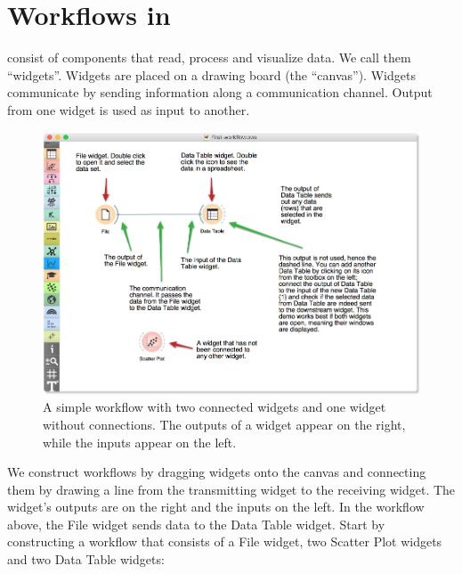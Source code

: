 \chapter{Workflows in \mutation}
\label{ch:workflows}

 consist of components that read, process and visualize data. We call them “widgets”. Widgets are placed on a drawing board (the “canvas”). Widgets communicate by sending information along a communication channel. Output from one widget is used as input to another.

\begin{figure}[h]
  \includegraphics[width=\linewidth]{workflow-fig1.png}%
  \caption{A simple workflow with two connected widgets and one widget without connections. The outputs of a widget appear on the right, while the inputs appear on the left.}
  \label{fig:workflow-fig1}
\end{figure}

We construct workflows by dragging widgets onto the canvas and connecting them by drawing a line from the transmitting widget to the receiving widget. The widget’s outputs are on the right and the inputs on the left. In the workflow above, the File widget sends data to the Data Table widget.
\newpage
Start by constructing a workflow that consists of a File widget, two Scatter Plot widgets and two Data Table widgets:

